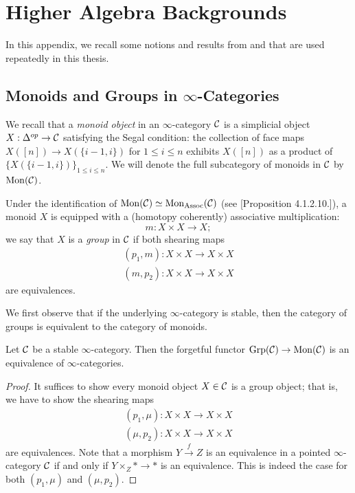 \chapter{Higher Algebra Backgrounds}

In this appendix, we recall some notions and results from \cite{HTT} and \cite{HA} that are used repeatedly in this thesis.


\section{Monoids and Groups in $\infty$-Categories}
We recall that a \emph{monoid object} in an $\infty$-category ${\mathcal{C}}$ is a simplicial object $X: \Delta^{op}\to {\mathcal{C}}$ satisfying the Segal condition:
the collection of face maps $X([n])\to X(\{i-1,i\})$ for $1\leq i \leq n$ exhibits $X([n])$ as a product of $\{X(\{i-1,i\})\}_{1\leq i \leq n}$. 
We will denote the full subcategory of monoids in ${\mathcal{C}}$ by $\operatorname{Mon}({\mathcal{C}})$.

Under the identification of $\operatorname{Mon}({\mathcal{C}})\simeq \operatorname{Mon}_{\operatorname{Assoc}}({\mathcal{C}})$ (see \cite{HA}[Proposition 4.1.2.10.]), a monoid $X$ is equipped with a (homotopy coherently) associative multiplication:
$$
m: X\times X\to X;
$$
we say that $X$ is a \emph{group} in ${\mathcal{C}}$ if both shearing maps
\begin{align*}
			(p_1, m):X\times X\to X\times X\\
	(m,p_2):X\times X\to X\times X
\end{align*}
are equivalences.

We first observe that if the underlying $\infty$-category is stable, then the category of groups is equivalent to the category of monoids.
\begin{proposition}
	Let ${\mathcal{C}}$ be a stable $\infty$-category. Then the forgetful functor 
$\operatorname{Grp}({\mathcal{C}})\to \operatorname{Mon}({\mathcal{C}})$ is an equivalence of $\infty$-categories.
\end{proposition}
\begin{proof}
	It suffices to show every monoid object $X\in {\mathcal{C}}$ is a group object; that is, we have to show the shearing maps
	\begin{align*}
			(p_1, \mu):X\times X\to X\times X\\
	(\mu,p_2):X\times X\to X\times X
	\end{align*}
	are equivalences. Note that a morphism $Y\xrightarrow{f} Z$ is an equivalence in a pointed $\infty$-category ${\mathcal{C}}$ if and only if $Y\times_{Z}*\to *$ is an equivalence. This is indeed the case for both $(p_1,\mu)$ and $(\mu,p_2)$.
	
\end{proof}

